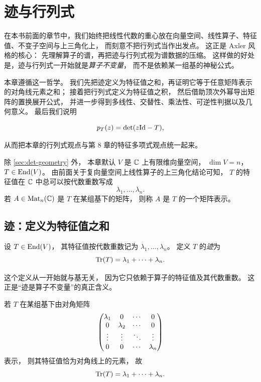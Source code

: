 \chapter{迹与行列式}




在本书前面的章节中，我们始终把线性代数的重心放在向量空间、线性算子、特征值、不变子空间与上三角化上， 而刻意不把行列式当作出发点。 这正是 Axler 风格的核心： 先理解算子的谱，再把迹与行列式视为谱数据的压缩。 这样做的好处是，迹与行列式一开始就是\emph{算子不变量}， 而不是依赖某一组基的神秘公式。




本章遵循这一哲学。 我们先把迹定义为特征值之和，再证明它等于任意矩阵表示的对角线元素之和； 接着把行列式定义为特征值之积， 然后借助顶次外幂导出矩阵的置换展开公式， 并进一步得到多线性、交替性、乘法性、可逆性判据以及几何意义。 最后我们说明




\[ p_T(z)=\det(z\mathrm{Id}-T), \]




从而把本章的行列式观点与第 8 章的特征多项式观点统一起来。




\begin{notation} 除 \cref{sec:det-geometry} 外， 本章默认 \(V\) 是 \(\mathbb{C}\) 上有限维向量空间， \(\dim V=n\)， \(T\in \mathrm{End}(V)\)。 由前面关于复向量空间上线性算子的上三角化结论可知， \(T\) 的特征值在 \(\mathbb{C}\) 中总可以按代数重数写成 \[ \lambda_1,\dots,\lambda_n. \] 若 \(A\in \mathrm{Mat}_n(\mathbb{C})\) 是 \(T\) 在某组基下的矩阵， 则称 \(A\) 是 \(T\) 的一个矩阵表示。 \end{notation}




\section{迹：定义为特征值之和}




\begin{definition} 设 \(T\in \mathrm{End}(V)\)， 其特征值按代数重数记为 \(\lambda_1,\dots,\lambda_n\)。 定义 \(T\) 的\emph{迹}为 \[ \mathrm{Tr}(T)=\lambda_1+\cdots+\lambda_n. \] \end{definition} 这个定义从一开始就与基无关， 因为它只依赖于算子的特征值及其代数重数。 这正是“迹是算子不变量”的真正含义。




\begin{example} 若 \(T\) 在某组基下由对角矩阵 \[ \begin{pmatrix}  \lambda_1&0&\cdots&0\\ 0&\lambda_2&\cdots&0\\ \vdots&\vdots&\ddots&\vdots\\ 0&0&\cdots&\lambda_n \end{pmatrix} \] 表示， 则其特征值恰为对角线上的元素， 故 \[ \mathrm{Tr}(T)=\lambda_1+\cdots+\lambda_n. \] \end{example}




